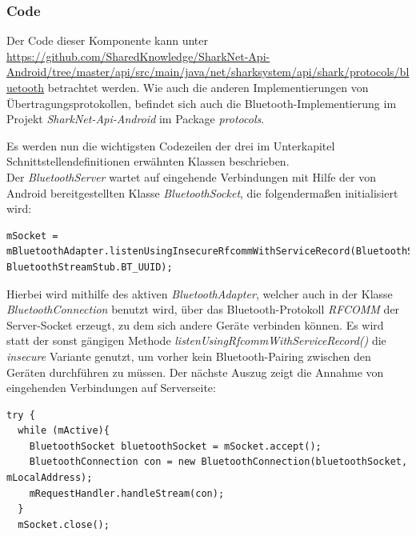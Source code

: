 \subsubsection{Code}
\begin{sloppypar}
Der Code dieser Komponente kann unter \url{https://github.com/SharedKnowledge/SharkNet-Api-Android/tree/master/api/src/main/java/net/sharksystem/api/shark/protocols/bluetooth} betrachtet werden. Wie auch die anderen Implementierungen von Über\-tra\-gungs\-pro\-to\-kol\-len, befindet sich auch die Bluetooth-Implementierung im Projekt \textit{SharkNet-Api-Android} im Package \textit{protocols}.\\
\end{sloppypar}
Es werden nun die wichtigsten Codezeilen der drei im Unterkapitel Schnittstellendefinitionen erwähnten Klassen beschrieben.
\\Der \textit{BluetoothServer} wartet auf eingehende Verbindungen mit Hilfe der von Android bereitgestellten Klasse \textit{BluetoothSocket}, die folgendermaßen initialisiert wird:\\
 \lstset{language=Java, caption=Initialisierung des Bluetooth-Server-Sockets, label=DescriptiveLabel, numbers=left, numbersep=1em, breaklines=true, basicstyle=\small}
\begin{lstlisting}
mSocket = mBluetoothAdapter.listenUsingInsecureRfcommWithServiceRecord(BluetoothStreamStub.BT_NAME, BluetoothStreamStub.BT_UUID);
\end{lstlisting}
Hierbei wird mithilfe des aktiven \textit{BluetoothAdapter}, welcher auch in der Klasse \textit{Bluetooth\-Connection} benutzt wird, über das Bluetooth-Protokoll \textit{RFCOMM} der Server-Socket erzeugt, zu dem sich andere Geräte verbinden können. Es wird statt der sonst gängigen Methode \textit{listenUsingRfcommWithServiceRecord()} die \textit{insecure} Variante genutzt, um vorher kein Bluetooth-Pairing zwischen den Geräten durchführen zu müssen. Der nächste Auszug zeigt die Annahme von eingehenden Verbindungen auf Serverseite:\newline
 \lstset{language=Java, caption=Serverseitige Annahme der Bluetooth-Verbindungen (Auszug), label=DescriptiveLabel, numbers=left, numbersep=1em, breaklines=true, basicstyle=\small}
\begin{lstlisting}
try {
  while (mActive){
    BluetoothSocket bluetoothSocket = mSocket.accept();
    BluetoothConnection con = new BluetoothConnection(bluetoothSocket, mLocalAddress);
    mRequestHandler.handleStream(con);
  }
  mSocket.close();
\end{lstlisting}
